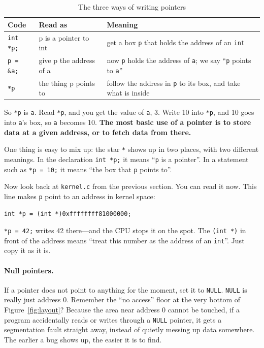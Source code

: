 \begin{table}[htbp]
  \begin{lazywide}
  \caption{The three ways of writing pointers}
  \label{tab:pointer}
  \begin{tabular}{L{2.4cm}L{3.4cm}L{6.2cm}}
    \toprule
    Code & Read as & Meaning \\
    \midrule
    \texttt{int *p;} & p is a pointer to int & get a box \texttt{p} that holds the address of an \texttt{int} \\
    \texttt{p = \&a;} & give p the address of a & now \texttt{p} holds the address of \texttt{a}; we say ``\texttt{p} points to \texttt{a}'' \\
    \texttt{*p} & the thing p points to & follow the address in \texttt{p} to its box, and take what is inside \\
    \bottomrule
  \end{tabular}
  \end{lazywide}
\end{table}

So \texttt{*p} is \texttt{a}. Read \texttt{*p}, and you get the value of \texttt{a}, 3. Write 10 into \texttt{*p}, and 10 goes into \texttt{a}'s box, so \texttt{a} becomes 10. \textbf{The most basic use of a pointer is to store data at a given address, or to fetch data from there.}

One thing is easy to mix up: the star \texttt{*} shows up in two places, with two different meanings. In the declaration \texttt{int *p;} it means ``\texttt{p} is a pointer''. In a statement such as \texttt{*p = 10;} it means ``the box that \texttt{p} points to''.

Now look back at \texttt{kernel.c} from the previous section. You can read it now. This line makes \texttt{p} point to an address in kernel space:
\begin{verbatim}
int *p = (int *)0xffffffff81000000;
\end{verbatim}
\texttt{*p = 42;} writes 42 there---and the CPU stops it on the spot. The \texttt{(int *)} in front of the address means ``treat this number as the address of an \texttt{int}''. Just copy it as it is.

\paragraph{Null pointers.}
If a pointer does not point to anything for the moment, set it to \texttt{NULL}. \texttt{NULL} is really just address 0. Remember the ``no access'' floor at the very bottom of Figure~\ref{fig:layout}? Because the area near address 0 cannot be touched, if a program accidentally reads or writes through a \texttt{NULL} pointer, it gets a segmentation fault straight away, instead of quietly messing up data somewhere. The earlier a bug shows up, the easier it is to find.

